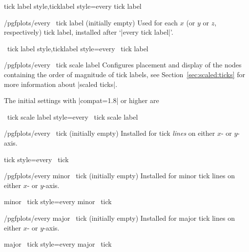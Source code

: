 \pgfplotsshortxystylekeys tick label style,ticklabel style=every tick label\pgfeov

\begin{xystylekey}{/pgfplots/every \x\ tick label (initially empty)}
    Used for each $x$ (or $y$ or $z$, respectively) tick label, installed after
    `|every tick label|'.
\end{xystylekey}

\pgfplotsshortxystylekeys \x\ tick label style,\x ticklabel style=every \x\ tick label\pgfeov

\begin{xystylekey}{/pgfplots/every \x\ tick scale label}
    Configures placement and display of the nodes containing the order of
    magnitude of tick labels, see Section~\ref{sec:scaled:ticks} for more
    information about |scaled ticks|.

    The initial settings with |compat=1.8| or higher are
\begin{codeexample}
\end{codeexample}
\end{xystylekey}

\pgfplotsshortxystylekey \x\ tick scale label style=every \x\ tick scale label\pgfeov

\begin{xystylekey}{/pgfplots/every \x\ tick (initially empty)}
    Installed for tick \emph{lines} on either $x$- or $y$-axis.
\end{xystylekey}

\pgfplotsshortxystylekey \x tick style=every \x\ tick\pgfeov

\begin{xystylekey}{/pgfplots/every minor \x\ tick (initially empty)}
    Installed for minor tick lines on either $x$- or $y$-axis.
\end{xystylekey}

\pgfplotsshortxystylekey minor \x\ tick style=every minor \x\ tick\pgfeov

\begin{xystylekey}{/pgfplots/every major \x\ tick (initially empty)}
    Installed for major tick lines on either $x$- or $y$-axis.
\end{xystylekey}
\pgfplotsshortxystylekey major \x\ tick style=every major \x\ tick\pgfeov


